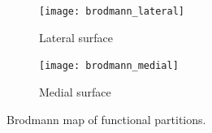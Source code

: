 \begin{figure}[H]
	\centering
	\centering
	\begin{subfigure}{0.475\linewidth}
		
		\centering
		\texttt{[image: brodmann\_lateral]}
		\caption{Lateral surface}
		\label{fig:brodmann_lateral}
		
	\end{subfigure}
	\hfill
	\begin{subfigure}{0.475\linewidth}
		
		\centering
		\texttt{[image: brodmann\_medial]}
		\caption{Medial surface}
		\label{fig:brodmann_medial}
	\end{subfigure}
	\caption{Brodmann map of functional partitions.}
	\label{fig:corticalfunctions}
\end{figure}


